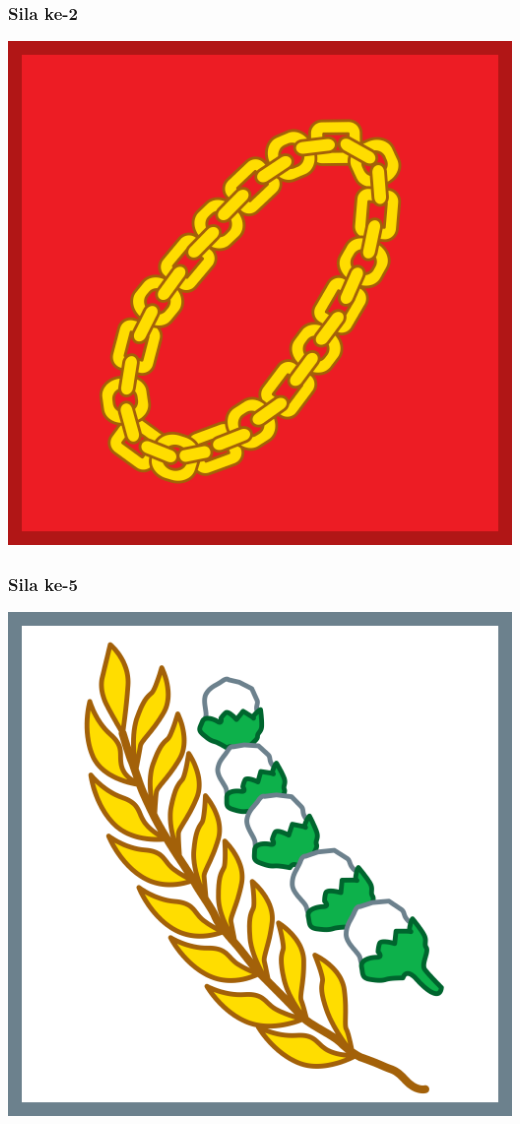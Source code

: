 \documentclass[11pt]{beamer}
\begin{document}
\begin{frame}
	\frametitle{Sila ke-2}
	\begin{center}
	\includegraphics[scale=0.2]{RantaiEmas.png}
	\end{center}
\end{frame}

\begin{frame}
	\frametitle{Sila ke-5}
	\begin{center}
	\includegraphics[scale=0.2]{PadiKapas.png}
\end{center}
\end{frame}
\end{document}
